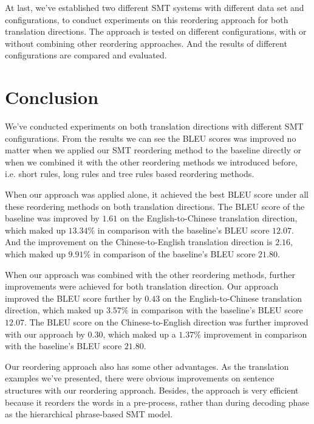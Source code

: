 At last, we've established two different SMT systems with different data set and configurations, to conduct experiments on this reordering approach for both translation directions. The approach is tested on different configurations, with or without combining other reordering approaches. And the results of different configurations are compared and evaluated.

\section{Conclusion}
\label{ch:Discussion:sec:Conclusion}

We've conducted experiments on both translation directions with different SMT configurations. From the results we can see the BLEU scores was improved no matter when we applied our SMT reordering method to the baseline directly or when we combined it with the other reordering methods we introduced before, i.e. short rules, long rules and tree rules based reordering methods.

When our approach was applied alone, it achieved the best BLEU score under all these reordering methods on both translation directions. The BLEU score of the baseline was improved by $1.61$ on the English-to-Chinese translation direction, which maked up $13.34\%$ in comparison with the baseline's BLEU score $12.07$. And the improvement on the Chinese-to-English translation direction is $2.16$, which maked up $9.91\%$ in comparison of the baseline's BLEU score $21.80$.

When our approach was combined with the other reordering methods, further improvements were achieved for both translation direction. Our approach improved the BLEU score further by $0.43$ on the English-to-Chinese translation direction, which maked up $3.57\%$ in comparison with the baseline's BLEU score $12.07$. The BLEU score on the Chinese-to-English direction was further improved with our approach by $0.30$, which maked up a $1.37\%$ improvement in comparison with the baseline's BLEU score $21.80$.

Our reordering approach also has some other advantages. As the translation examples we've presented, there were obvious improvements on sentence structures with our reordering approach. Besides, the approach is very efficient because it reorders the words in a pre-process, rather than during decoding phase as the hierarchical phrase-based SMT model. 


